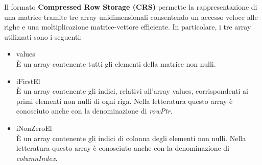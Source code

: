 Il formato \textbf{Compressed Row Storage (CRS)} permette la rappresentazione di una matrice tramite tre array unidimensionali consentendo un accesso veloce alle righe e una moltiplicazione matrice-vettore efficiente. In particolare, i tre array utilizzati sono i seguenti:
\begin{itemize}
	\item values\\
	È un array contenente tutti gli elementi della matrice non nulli.
	\item iFirstEl\\
	È un array contenente gli indici, relativi all'array values, corrispondenti ai primi elementi non nulli di ogni riga. Nella letteratura questo array è conosciuto anche con la denominazione di \textit{rowPtr}.
	\item iNonZeroEl\\
	È un array contenente gli indici di colonna degli elementi non nulli. Nella letteratura questo array è conosciuto anche con la denominazione di \textit{columnIndex}.
\end{itemize}